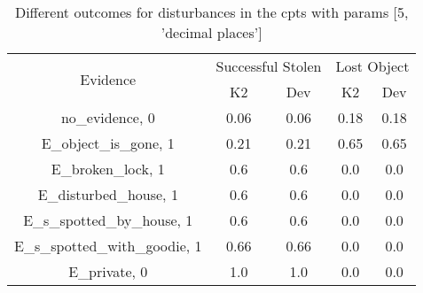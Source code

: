 \begin{table}\begin{tabular}{c|cc|cc}\toprule\multirow{2}{*}{Evidence} & \multicolumn{2}{c}{Successful Stolen} & \multicolumn{2}{c}{Lost Object} \\& {K2} & {Dev} & {K2} & {Dev} \\\midrule
no\_evidence, 0 & 0.06&0.06&0.18&0.18\\E\_object\_is\_gone, 1 & 0.21&0.21&0.65&0.65\\E\_broken\_lock, 1 & 0.6&0.6&0.0&0.0\\E\_disturbed\_house, 1 & 0.6&0.6&0.0&0.0\\E\_s\_spotted\_by\_house, 1 & 0.6&0.6&0.0&0.0\\E\_s\_spotted\_with\_goodie, 1 & 0.66&0.66&0.0&0.0\\E\_private, 0 & 1.0&1.0&0.0&0.0\\\bottomrule\end{tabular}\caption{Different outcomes for disturbances in the cpts with params [5, 'decimal places']}\end{table}